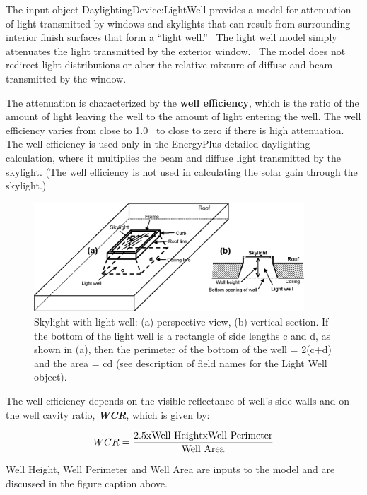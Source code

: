 The input object DaylightingDevice:LightWell provides a model for attenuation of light transmitted by windows and skylights that can result from surrounding interior finish surfaces that form a ``light well.''~ The light well model simply attenuates the light transmitted by the exterior window.~ The model does not redirect light distributions or alter the relative mixture of diffuse and beam transmitted by the window.

The attenuation is characterized by the \textbf{well efficiency}, which is the ratio of the amount of light leaving the well to the amount of light entering the well. The well efficiency varies from close to 1.0~ to close to zero if there is high attenuation. The well efficiency is used only in the EnergyPlus detailed daylighting calculation, where it multiplies the beam and diffuse light transmitted by the skylight. (The well efficiency is not used in calculating the solar gain through the skylight.)

\begin{figure}[hbtp] %
\centering
\includegraphics[width=0.9\textwidth, height=0.9\textheight, keepaspectratio=true]{media/image907.png}
\caption{Skylight with light well: (a) perspective view, (b) vertical section. If the bottom of the light well is a rectangle of side lengths c and d, as shown in (a), then the perimeter of the bottom of the well = 2(c+d) and the area = cd (see description of field names for the Light Well object). \protect \label{fig:skylight-with-light-well-a-perspective-view-b}}
\end{figure}

The well efficiency depends on the visible reflectance of well's side walls and on the well cavity ratio, \textbf{\emph{WCR}}, which is given by:

\begin{equation}
WCR = \frac{{{\rm{2}}{\rm{.5 x Well~Height x Well~Perimeter}}}}{{{\rm{Well~Area}}}}
\end{equation}

Well Height, Well Perimeter and Well Area are inputs to the model and are discussed in the figure caption above.

